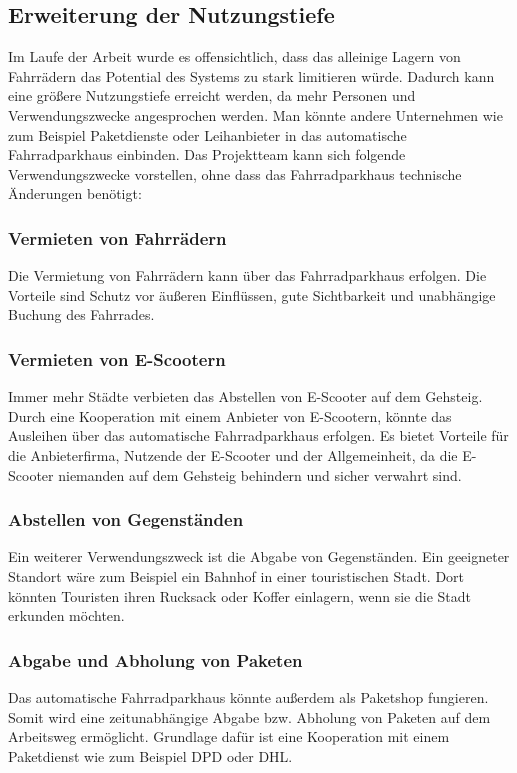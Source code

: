 \break
\subsection{Erweiterung der Nutzungstiefe}

Im Laufe der Arbeit wurde es offensichtlich, dass das alleinige Lagern von Fahrrädern das Potential des Systems zu stark limitieren würde. Dadurch kann eine größere Nutzungstiefe erreicht werden, da mehr Personen und Verwendungszwecke angesprochen werden.
\noindent Man könnte andere Unternehmen wie zum Beispiel Paketdienste oder Leihanbieter in das automatische Fahrradparkhaus einbinden.
\noindent Das Projektteam kann sich folgende Verwendungszwecke vorstellen, ohne dass das Fahrradparkhaus technische Änderungen benötigt:

\subsubsection{Vermieten von Fahrrädern}
Die Vermietung von Fahrrädern kann über das Fahrradparkhaus erfolgen. Die Vorteile sind Schutz vor äußeren Einflüssen, gute Sichtbarkeit und unabhängige Buchung des Fahrrades.

\subsubsection{Vermieten von E-Scootern}
Immer mehr Städte verbieten das Abstellen von E-Scooter auf dem Gehsteig.  Durch eine Kooperation mit einem Anbieter von E-Scootern, könnte das Ausleihen über das automatische Fahrradparkhaus erfolgen. Es bietet Vorteile für die Anbieterfirma, Nutzende der E-Scooter und der Allgemeinheit, da die E-Scooter niemanden auf dem Gehsteig behindern und sicher verwahrt sind.

\subsubsection{Abstellen von Gegenständen}
Ein weiterer Verwendungszweck ist die Abgabe von Gegenständen. Ein geeigneter Standort wäre zum Beispiel ein Bahnhof in einer touristischen Stadt. Dort könnten Touristen ihren Rucksack oder Koffer einlagern, wenn sie die Stadt erkunden möchten.

\subsubsection{Abgabe und Abholung von Paketen}
Das automatische Fahrradparkhaus könnte außerdem als Paketshop fungieren. Somit wird eine zeitunabhängige Abgabe bzw. Abholung von Paketen auf dem Arbeitsweg ermöglicht. Grundlage dafür ist eine Kooperation mit einem Paketdienst wie zum Beispiel DPD oder DHL.

